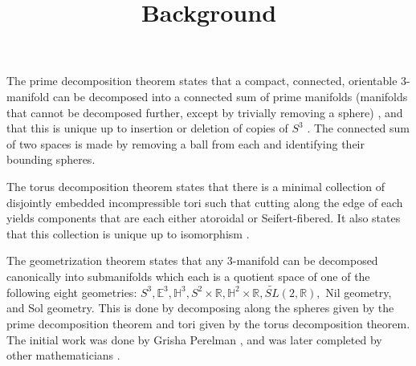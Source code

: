 \documentclass[12pt]{amsart}
\newcommand{\ignore}[1]{}
\begin{document}
\title{Background}
\maketitle

\ignore{1.  Describe 3-manifold decompositions.
  A.  Prime decomposition theorem -- see Allen Hatcher's notes for statement and references.

}
\ignore{@Misc{•,
OPTkey = {•},
OPTauthor = {Allen Hatcher},
OPTtitle = {Notes on Basic 3-Manifold Topology},
OPThowpublished = {•},
OPTmonth = {•},
OPTyear = {•},
OPTnote = {•},
OPTannote = {•}
}}

The prime decomposition theorem states that a compact, connected, orientable 3-manifold can be decomposed into a connected sum of prime manifolds (manifolds that cannot be decomposed further, except by trivially removing a sphere) \cite{Kneser}, and that this is unique up to insertion or deletion of copies of $S^3$ \cite{Milnor}. The connected sum of two spaces is made by removing a ball from each and identifying their bounding spheres.
  

The torus decomposition theorem states that there is a minimal collection of disjointly embedded incompressible tori such that cutting along the edge of each yields components that are each either atoroidal or Seifert-fibered. It also states that this collection is unique up to isomorphism \cite{JSJ3} \cite{JSJ2} \cite{JSJ1} \cite{JSJ4}.



The geometrization theorem states that any 3-manifold can be decomposed canonically into submanifolds which each is a quotient space of one of the following eight geometries: $S^3, \mathbb{E}^3, \mathbb{H}^3, S^2 \times \mathbb{R}, \mathbb{H}^2 \times \mathbb{R}, \tilde{SL}(2,\mathbb{R}),$ Nil geometry, and Sol geometry. This is done by decomposing along the spheres given by the prime decomposition theorem and tori given by the torus decomposition theorem. The initial work was done by Grisha Perelman \cite{Perelman1} \cite{Perelman3} \cite{Perelman2}, and was later completed by other mathematicians \cite{Geometrization1} \cite{Geometrization2} \cite{Geometrization3}.
\end{document}
